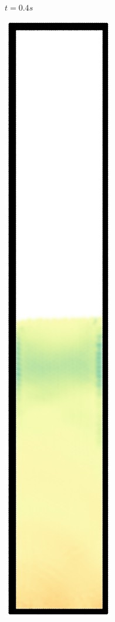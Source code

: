 \begin{figure}[h]
\begin{subfigure}[t]{0.09\textwidth}
    \caption{\small{$t=0.4s$}}
  \end{subfigure}%
  \begin{subfigure}[t]{0.09\textwidth}
    \includegraphics[width=\textwidth]{images/oscillate/050.jpg}

\end{subfigure}
\end{figure}
